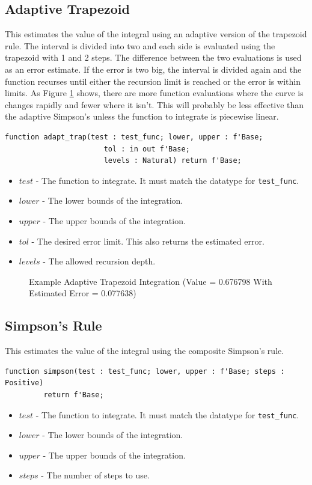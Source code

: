 \documentclass[10pt, openany]{book}
\newcommand{\indexfunc}[1]{\index[func]{#1}}
\newcommand{\datatype}[1]{\texttt{#1}}
\begin{document}
\subsection{Adaptive Trapezoid}
This estimates the value of the integral using an adaptive version of the trapezoid rule.  The interval is divided into two and each side is evaluated using the trapezoid with 1 and 2 steps.  The difference between the two evaluations is used as an error estimate.  If the error is two big, the interval is divided again and the function recurses until either the recursion limit is reached or the error is within limits.  As Figure \ref{tex:AdaptTrap} shows, there are more function evaluations where the curve is changes rapidly and fewer where it isn't.  This will probably be less effective than the adaptive Simpson's unless the function to integrate is piecewise linear.
\begin{lstlisting}
function adapt_trap(test : test_func; lower, upper : f'Base;
                       tol : in out f'Base;
                       levels : Natural) return f'Base;
\end{lstlisting}
\indexfunc{integ-adapt\_trap}
\begin{itemize}
  \item $test$ - The function to integrate.  It must match the datatype for \datatype{test\_func}.
  \item $lower$ - The lower bounds of the integration.
  \item $upper$ - The upper bounds of the integration.
  \item $tol$ - The desired error limit.  This also returns the estimated error.
  \item $levels$ - The allowed recursion depth.
\end{itemize}

\begin{figure}
  
  \caption{Example Adaptive Trapezoid Integration (Value = 0.676798 With Estimated Error = 0.077638)}
  \label{tex:AdaptTrap}
\end{figure}

\subsection{Simpson's Rule}
This estimates the value of the integral using the composite Simpson's rule.
\begin{lstlisting}
function simpson(test : test_func; lower, upper : f'Base; steps : Positive)
         return f'Base;
\end{lstlisting}
\indexfunc{integ-simpson}
\begin{itemize}
  \item $test$ - The function to integrate.  It must match the datatype for \datatype{test\_func}.
  \item $lower$ - The lower bounds of the integration.
  \item $upper$ - The upper bounds of the integration.
  \item $steps$ - The number of steps to use.
\end{itemize}
\end{document}
